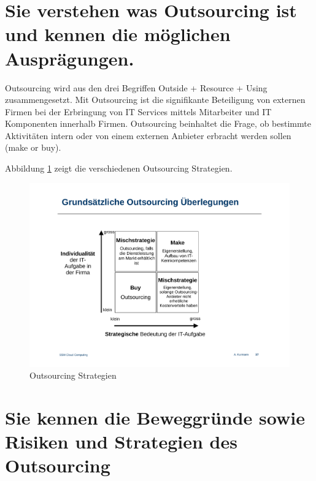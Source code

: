\section{Sie verstehen was Outsourcing ist und kennen die möglichen Ausprägungen.}

Outsourcing wird aus den drei Begriffen Outside + Resource + Using zusammengesetzt. Mit Outsourcing ist die signifikante Beteiligung von externen Firmen bei der Erbringung von IT Services mittels Mitarbeiter und IT Komponenten innerhalb Firmen. Outsourcing beinhaltet die Frage, ob bestimmte Aktivitäten intern oder von einem externen Anbieter erbracht werden sollen (make or buy).

Abbildung \ref{fig:outsourcing-strategie} zeigt die verschiedenen Outsourcing Strategien.
\begin{figure}
	\centering
	\includegraphics[width=0.7\linewidth]{fig/outsourcing-strategie}
	\caption{Outsourcing Strategien}
	\label{fig:outsourcing-strategie}
\end{figure}

\section{Sie kennen die Beweggründe sowie Risiken und Strategien des Outsourcing}
